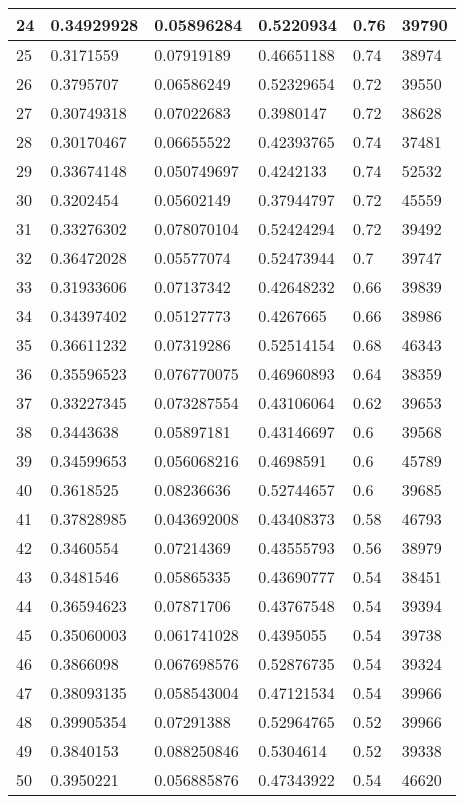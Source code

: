 \begin{longtable}{|l|l|l|l|l|l|}
24 & 0.34929928 & 0.05896284 & 0.5220934 & 0.76 & 39790 \\ \hline 
25 & 0.3171559 & 0.07919189 & 0.46651188 & 0.74 & 38974 \\ \hline 
26 & 0.3795707 & 0.06586249 & 0.52329654 & 0.72 & 39550 \\ \hline 
27 & 0.30749318 & 0.07022683 & 0.3980147 & 0.72 & 38628 \\ \hline 
28 & 0.30170467 & 0.06655522 & 0.42393765 & 0.74 & 37481 \\ \hline 
29 & 0.33674148 & 0.050749697 & 0.4242133 & 0.74 & 52532 \\ \hline 
30 & 0.3202454 & 0.05602149 & 0.37944797 & 0.72 & 45559 \\ \hline 
31 & 0.33276302 & 0.078070104 & 0.52424294 & 0.72 & 39492 \\ \hline 
32 & 0.36472028 & 0.05577074 & 0.52473944 & 0.7 & 39747 \\ \hline 
33 & 0.31933606 & 0.07137342 & 0.42648232 & 0.66 & 39839 \\ \hline 
34 & 0.34397402 & 0.05127773 & 0.4267665 & 0.66 & 38986 \\ \hline 
35 & 0.36611232 & 0.07319286 & 0.52514154 & 0.68 & 46343 \\ \hline 
36 & 0.35596523 & 0.076770075 & 0.46960893 & 0.64 & 38359 \\ \hline 
37 & 0.33227345 & 0.073287554 & 0.43106064 & 0.62 & 39653 \\ \hline 
38 & 0.3443638 & 0.05897181 & 0.43146697 & 0.6 & 39568 \\ \hline 
39 & 0.34599653 & 0.056068216 & 0.4698591 & 0.6 & 45789 \\ \hline 
40 & 0.3618525 & 0.08236636 & 0.52744657 & 0.6 & 39685 \\ \hline 
41 & 0.37828985 & 0.043692008 & 0.43408373 & 0.58 & 46793 \\ \hline 
42 & 0.3460554 & 0.07214369 & 0.43555793 & 0.56 & 38979 \\ \hline 
43 & 0.3481546 & 0.05865335 & 0.43690777 & 0.54 & 38451 \\ \hline 
44 & 0.36594623 & 0.07871706 & 0.43767548 & 0.54 & 39394 \\ \hline 
45 & 0.35060003 & 0.061741028 & 0.4395055 & 0.54 & 39738 \\ \hline 
46 & 0.3866098 & 0.067698576 & 0.52876735 & 0.54 & 39324 \\ \hline 
47 & 0.38093135 & 0.058543004 & 0.47121534 & 0.54 & 39966 \\ \hline 
48 & 0.39905354 & 0.07291388 & 0.52964765 & 0.52 & 39966 \\ \hline 
49 & 0.3840153 & 0.088250846 & 0.5304614 & 0.52 & 39338 \\ \hline 
50 & 0.3950221 & 0.056885876 & 0.47343922 & 0.54 & 46620 \\ \hline 
\end{longtable}